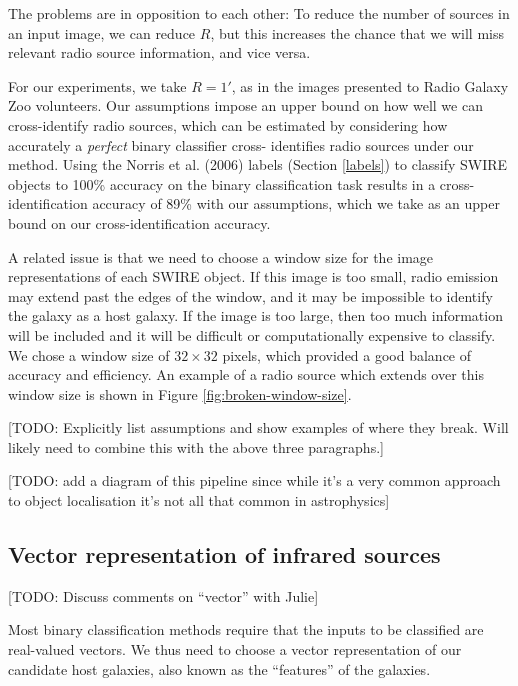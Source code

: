 \documentclass[fleqn,usenatbib,usedcolumn]{mnras}
\begin{document}
    The problems are in opposition to each other: To reduce the number of
    sources in an input image, we can reduce $R$, but this increases the
    chance that we will miss relevant radio source information, and vice
    versa.

    For our experiments, we take $R = 1'$, as in the images presented to
    Radio Galaxy Zoo volunteers. Our assumptions impose an upper bound on how
    well we can cross-identify radio sources, which can be estimated by
    considering how accurately a \emph{perfect} binary classifier cross-
    identifies radio sources under our method. Using the Norris et al. (2006)
    labels (Section \ref{labels}) to classify SWIRE objects to 100\% accuracy
    on the binary classification task results in a cross-identification
    accuracy of 89\% with our assumptions, which we take as an upper bound on
    our cross-identification accuracy.

    A related issue is that we need to choose a window size for the image
    representations of each SWIRE object. If this image is too small, radio
    emission may extend past the edges of the window, and it may be impossible
    to identify the galaxy as a host galaxy. If the image is too large, then
    too much information will be included and it will be difficult or
    computationally expensive to classify. We chose a window size of $32
    \times 32$ pixels, which provided a good balance of accuracy and
    efficiency. An example of a radio source which extends over this window
    size is shown in Figure \ref{fig:broken-window-size}.

    {[}TODO: Explicitly list assumptions and show examples of where they
    break. Will likely need to combine this with the above three
    paragraphs.{]}

    {[}TODO: add a diagram of this pipeline since while it's a very common
    approach to object localisation it's not all that common in
    astrophysics{]}

  \subsection{Vector representation of infrared
  sources}\label{vector-representation-of-infrared-sources}

    {[}TODO: Discuss comments on ``vector'' with Julie{]}

    Most binary classification methods require that the inputs to be
    classified are real-valued vectors. We thus need to choose a vector
    representation of our candidate host galaxies, also known as the
    ``features'' of the galaxies.
\end{document}
